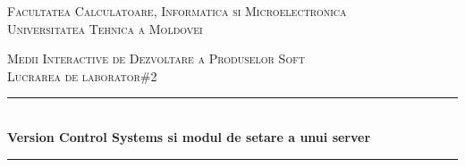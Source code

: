\begin{titlepage}

  \begin{center} %

  \textsc{\large Facultatea Calculatoare, Informatica si Microelectronica}\\[0.5cm]
  \textsc{\large Universitatea Tehnica a Moldovei}\\[1.2cm] %
  \vspace{25 mm}

  \textsc{\Large Medii Interactive de Dezvoltare a Produselor Soft}\\[0.5cm] %
  \textsc{\large Lucrarea de laborator\#2}\\[0.5cm] %

\newcommand{\HRule}{\rule{\linewidth}{0.5mm}} %

  \vspace{10 mm}
  \HRule \\[0.4cm]
  { \LARGE \bfseries Version Control Systems si modul de setare a unui server  }\\[0.4cm] %
  \HRule \\[1.5cm]

      \vspace{30mm}


\end{center}
\end{titlepage}
